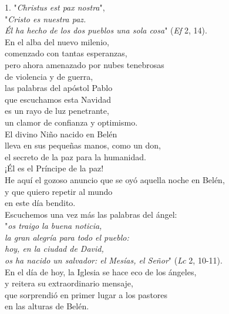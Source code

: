 1. "\emph{Christus est pax nostra}",\\
"\emph{Cristo es nuestra paz.\\
	Él ha hecho de los dos pueblos una sola cosa}" (\emph{Ef} 2, 14).\\
En el alba del nuevo milenio,\\
comenzado con tantas esperanzas,\\
pero ahora amenazado por nubes tenebrosas\\
de violencia y de guerra,\\
las palabras del apóstol Pablo\\
que escuchamos esta Navidad\\
es un rayo de luz penetrante,\\
un clamor de confianza y optimismo.\\
El divino Niño nacido en Belén\\
lleva en sus pequeñas manos, como un don,\\
el secreto de la paz para la humanidad.\\
¡Él es el Príncipe de la paz!\\
He aquí el gozoso anuncio que se oyó aquella noche en Belén,\\
y que quiero repetir al mundo\\
en este día bendito.\\
Escuchemos una vez más las palabras del ángel:\\
"\emph{os traigo la buena noticia,\\
	la gran alegría para todo el pueblo:\\
	hoy, en la ciudad de David,\\
	os ha nacido un salvador: el Mesías, el Señor}" (\emph{Lc} 2, 10-11).\\
En el día de hoy, la Iglesia se hace eco de los ángeles,\\
y reitera su extraordinario mensaje,\\
que sorprendió en primer lugar a los pastores\\
en las alturas de Belén.

